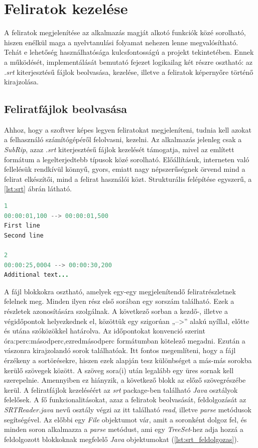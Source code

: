 \section{Feliratok kezelése}
A feliratok megjelenítése az alkalmazás magját alkotó funkciók közé sorolható, hiszen enélkül maga a nyelvtanulási folyamat nehezen lenne megvalósítható. Tehát e lehetőség használhatósága kulcsfontosságú a projekt tekintetében. Ennek a működését, implementálását bemutató fejezet logikailag két részre osztható: az \textit{.srt} kiterjesztésű fájlok beolvasása, kezelése, illetve a feliratok képernyőre történő kirajzolása.

\subsection{Feliratfájlok beolvasása}
Ahhoz, hogy a szoftver képes legyen feliratokat megjeleníteni, tudnia kell azokat a felhasználó számítógépéről felolvasni, kezelni. Az alkalmazás jelenleg csak a \textit{SubRip}, azaz \textit{.srt} kiterjesztésű fájlok kezelését támogatja, mivel az említett formátum a legelterjedtebb típusok közé sorolható. Előállításuk, interneten való fellelésük rendkívül könnyű, gyors, emiatt nagy népszerűségnek örvend mind a felirat elkészítői, mind a felirat használói közt. Strukturális felépítése egyszerű, a \ref{lst:srt} ábrán látható.

\begin{spacing}{1.25}
\begin{lstlisting}[language=java, caption=A .srt kiterjesztésű fájlok felépítése, label={lst:srt}]
1
00:00:01,100 --> 00:00:01,500
First line
Second line
 
2 
00:00:25,0004 --> 00:00:30,200 
Additional text...
\end{lstlisting}
\end{spacing}

A fájl blokkokra osztható, amelyek egy-egy megjelenítendő feliratrészletnek felelnek meg. Minden ilyen rész első sorában egy sorszám található. Ezek a részletek azonosítására szolgálnak. A következő sorban a kezdő-, illetve a végidőpontok helyezkednek el, közöttük egy szigorúan „-->” alakú nyíllal, előtte és utána szóközökkel határolva. Az időpontokat konvenció szerint óra:perc:másodperc,ezredmásodperc formátumban kötelező megadni. Ezután a vászonra kirajzolandó sorok találhatóak. Itt fontos megemlíteni, hogy a fájl érzékeny a sortörésekre, hiszen ezek alapján tesz különbséget a más-más sorokba kerülő szövegek között. A szöveg sora(i) után legalább egy üres sornak kell szerepelnie. Amennyiben ez hiányzik, a következő blokk az előző szövegrészébe kerül.
A feliratfájlok kezeléséért az \textit{srt} package-ben található \textit{Java} osztályok felelősek. A fő funkcionalitásokat, azaz a feliratok beolvasását, feldolgozását az \textit{SRTReader.java} nevű osztály végzi az itt található \textit{read}, illetve \textit{parse} metódusok segítségével. Az előbbi egy \textit{File} objektumot vár, amit a soronként dolgoz fel, és minden soron alkalmazza a \textit{parse} metódust, ami egy \textit{TreeSet}-hez adja hozzá a feldolgozott blokkoknak megfelelő \textit{Java} objektumokat (\ref{lst:srt_feldolgozas}).


